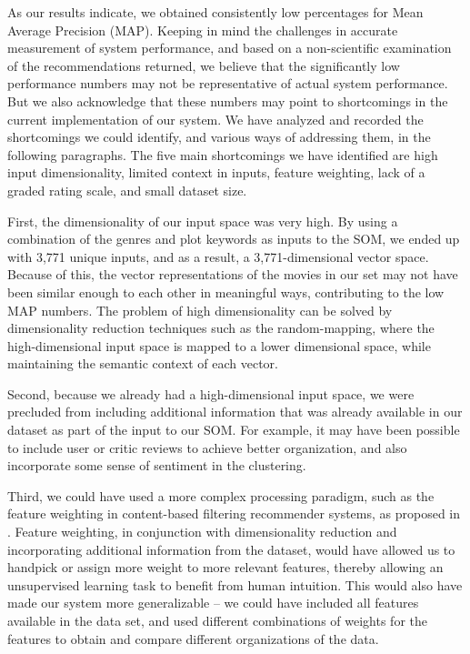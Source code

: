 \documentclass[conference]{IEEEtran}
\begin{document}
As our results indicate, we obtained consistently low percentages for Mean Average Precision (MAP). Keeping in mind the challenges in accurate measurement of system performance, and based on a non-scientific examination of the recommendations returned, we believe that the significantly low performance numbers may not be representative of actual system performance. But we also acknowledge that these numbers may point to shortcomings in the current implementation of our system. We have analyzed and recorded the shortcomings we could identify, and various ways of addressing them, in the following paragraphs. The five main shortcomings we have identified are high input dimensionality, limited context in inputs, feature weighting, lack of a graded rating scale, and small dataset size.

First, the dimensionality of our input space was very high. By using a combination of the genres and plot keywords as inputs to the SOM, we ended up with 3,771 unique inputs, and as a result, a 3,771-dimensional vector space. Because of this, the vector representations of the movies in our set may not have been similar enough to each other in meaningful ways, contributing to the low MAP numbers. The problem of high dimensionality can be solved by dimensionality reduction techniques such as the random-mapping, where the high-dimensional input space is mapped to a lower dimensional space, while maintaining the semantic context of each vector.

Second, because we already had a high-dimensional input space, we were precluded from including additional information that was already available in our dataset as part of the input to our SOM. For example, it may have been possible to include user or critic reviews to achieve better organization, and also incorporate some sense of sentiment in the clustering.

Third, we could have used a more complex processing paradigm, such as the feature weighting in content-based filtering recommender systems, as proposed in \cite{debnath2008feature}. Feature weighting, in conjunction with dimensionality reduction and incorporating additional information from the dataset, would have allowed us to handpick or assign more weight to more relevant features, thereby allowing an unsupervised learning task to benefit from human intuition. This would also have made our system more generalizable – we could have included all features available in the data set, and used different combinations of weights for the features to obtain and compare different organizations of the data.
\end{document}
